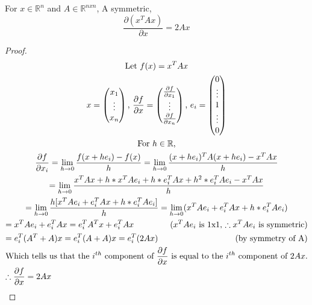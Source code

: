 \begin{lemma} \label{lemma1}
	For \(x \in \mathbb{R} ^n \) and \(A \in \mathbb{R}^{nxn}\), A symmetric,
	\[\frac{\partial (x^T A x)}{\partial x} = 2 A x\]
\end{lemma}
\begin{proof}
	\begin{multline*}
	\text{Let } f(x) = x^T A x \\
	x = \begin{pmatrix}
	x_1 \\
	\vdots \\
	x_n
	\end{pmatrix} \text{, }
	\frac{\partial{f}}{\partial{x}} = 
	\begin{pmatrix}
	\frac{\partial{f}}{\partial{x_1}} \\
	\vdots \\
	\frac{\partial{f}}{\partial{x_n}}
	\end{pmatrix} \text{, } e_i = 
	\begin{pmatrix}
	0 \\
	\vdots \\
	1 \\
	\vdots \\
	0
	\end{pmatrix} \\
	\text{For } h \in \mathbb{R} \text{,} \\
	\frac{\partial f}{\partial x_i} = \lim_{h \rightarrow 0} \frac{f(x+h e_i) - f(x)}{h} = \lim_{h \rightarrow 0} \frac{(x + h e_i)^T A (x + h e_i) - x^T A x}{h} \\
	= \lim_{h \rightarrow 0} \frac{ x^T A x + h * x^T A e_i + h * e_i^T A x + h^2 * e_i^T A e_i - x^T A x}{h} \\
	= \lim_{h \rightarrow 0} \frac{ h [x^T A e_i + e_i^T A x + h * e_i^T A e_i]}{h} = \lim_{h \rightarrow 0} ( x^T A e_i + e_i^T A x + h * e_i^T A e_i) \\
	= x^T A e_i + e_i^T A x = e_i^T A^T x + e_i^T A x \hfill \text{(\(x^T A e_i\) is 1x1, \(\therefore x^T A e_i\) is symmetric)} \\
	= e_i^T ( A^T + A) x  = e_i^T ( A + A) x = e_i^T (2A x) \hfill \text{(by symmetry of A)} \\
	\text{Which tells us that the \(i^{th}\) component of \(\frac{\partial f}{\partial x} \) is equal to the \(i^{th}\) component of \(2Ax\).} \\
	\therefore \frac{\partial f}{\partial x} = 2Ax \hfill
	\end{multline*}
\end{proof}

